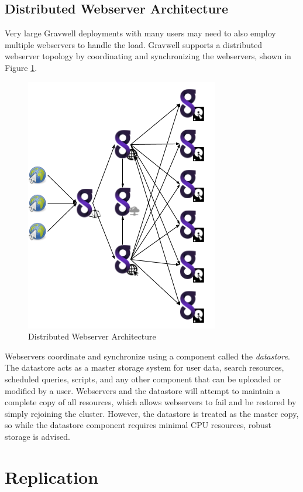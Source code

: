 {\subsection{Distributed Webserver Architecture}

Very large Gravwell deployments with many users may need to also employ
multiple webservers to handle the load. Gravwell supports a distributed
webserver topology by coordinating and synchronizing the webservers, 
shown in Figure \ref{fig:distributed}.

\begin{figure}[H]
	\includegraphics[width=0.6\linewidth]{images/distributed.png}
	\caption{Distributed Webserver Architecture}
	\label{fig:distributed}
\end{figure}

Webservers coordinate and synchronize using a component called the
\emph{datastore}. The datastore acts as a master storage system for user data,
search resources, scheduled queries, scripts, and any other component
that can be uploaded or modified by a user. Webservers and the
datastore will attempt to maintain a complete copy of all resources,
which allows webservers to fail and be restored by simply rejoining the
cluster. However, the datastore is treated as the master copy, so while
the datastore component requires minimal CPU resources, robust storage is advised.


\section{Replication}

}
